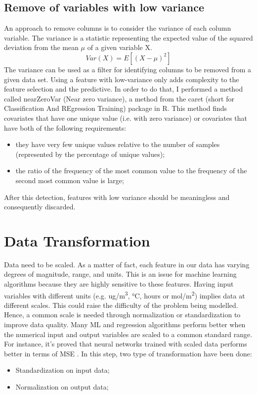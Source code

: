 \subsection{Remove of variables with low variance}
An approach to remove columns is to consider the variance of each column variable. The variance is a statistic representing the expected value of the squared deviation from the mean $\mu$ of a given variable X. 
\begin{equation}
  Var(X) = E[(X-\mu)^2]
\end{equation}
The variance can be used as a filter for identifying columns to be removed from a given data set. 
Using a feature with low-variance only adds complexity to the feature selection and the predictive.\newline
In order to do that, I performed a method called nearZeroVar (Near zero variance), a method from the caret (short for Classification And REgression Training) package in R.
This method finds covariates that have one unique value (i.e. with zero variance) or covariates that have both of the following requirements:
\begin{itemize}
\item they have very few unique values relative to the number of samples (represented by the percentage of unique values);
\item the ratio of the frequency of the most common value to the frequency of the second most common value is large;
\end{itemize}
After this detection, features with low variance should be meaningless and consequently discarded. 
\section{Data Transformation}
Data need to be scaled. As a matter of fact, each feature in our data has varying degrees of magnitude, range, and units. This is an issue for machine learning algorithms because they are highly sensitive to these features. 
Having input variables with different units (e.g. ug/m\textsuperscript{3}, °C, hours or mol/m\textsuperscript{2}) implies data at different scales. This could raise the difficulty of the problem being modelled. \newline
Hence, a common scale is needed through normalization or standardization to improve data quality.\newline
Many ML and regression algorithms perform better when the numerical input and output variables are scaled to a common standard range. \newline
For instance, it's proved that neural networks trained with scaled data performs better in terms of MSE \cite{shanker1996effect}.
In this step, two type of transformation have been done:
\begin{itemize}
    \item Standardization on input data;
    \item Normalization on output data;
\end{itemize}
